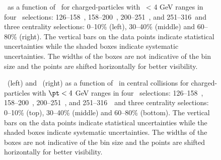 
\begin{figure}
   \caption{\DeltaTheta\ as a function of \rvar\ for charged-particles with \pt\ < 4 GeV ranges in 
   four \ptjet\ selections: 126--158~\GeV, 158--200~\GeV, 200--251~\GeV, and 251--316~\GeV and three centrality 
   selections: 0--10\% (left), 30--40\% (middle) and 60--80\% (right). 
   The vertical bars on the data points indicate statistical uncertainties while the shaded boxes indicate systematic uncertainties. The widths of the boxes are not indicative of the bin size and the points are shifted horizontally for better visibility. }
      \label{fig:deltaPdeltaT}
\end{figure}


\begin{figure}
   \caption{\RTheta\ (left) and \RP\ (right) as a function of \rvar\ in central collisions for charged-particles with $\pt < 4$ GeV ranges in four \ptjet\ selections: 126--158~\GeV, 158--200~\GeV, 200--251~\GeV, and 251--316~\GeV\ and three centrality selections: 0--10\% (top), 30--40\% (middle) and 60--80\% (bottom). The vertical bars on the data points indicate statistical uncertainties while the shaded boxes indicate systematic uncertainties. The widths of the boxes are not indicative of the bin size and the points are shifted horizontally for better visibility. }
      \label{fig:RPRT}
\end{figure}


